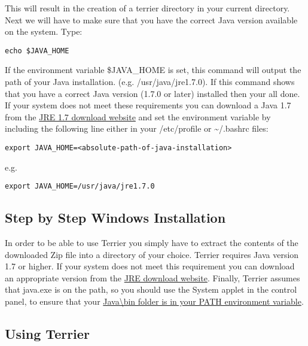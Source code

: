 This will result in the creation of a terrier directory in your current
directory. Next we will have to make sure that you have the correct Java
version available on the system. Type:

\begin{verbatim}
echo $JAVA_HOME
\end{verbatim}

If the environment variable \$JAVA\_HOME is set, this command will
output the path of your Java installation. (e.g. /usr/java/jre1.7.0). If
this command shows that you have a correct Java version (1.7.0 or later)
installed then your all done. If your system does not meet these
requirements you can download a Java 1.7 from the
\href{http://www.oracle.com/technetwork/java/javase/downloads/index.html}{JRE
1.7 download website} and set the environment variable by including the
following line either in your /etc/profile or \textasciitilde{}/.bashrc
files:

\begin{verbatim}
export JAVA_HOME=<absolute-path-of-java-installation>
\end{verbatim}

e.g.

\begin{verbatim}
export JAVA_HOME=/usr/java/jre1.7.0
\end{verbatim}

\subsection{Step by Step Windows
Installation}\label{step-by-step-windows-installation}

In order to be able to use Terrier you simply have to extract the
contents of the downloaded Zip file into a directory of your choice.
Terrier requires Java version 1.7 or higher. If your system does not
meet this requirement you can download an appropriate version from the
\href{http://www.oracle.com/technetwork/java/javase/downloads/index.html}{JRE
download website}. Finally, Terrier assumes that java.exe is on the
path, so you should use the System applet in the control panel, to
ensure that your
\href{http://www.oracle.com/technetwork/java/javase/install-windows-189425.html\#Environment}{Java\textbackslash{}bin
folder is in your PATH environment variable}.

\subsection{Using Terrier}\label{using-terrier}

